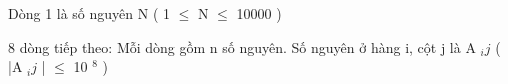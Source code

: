 Dòng 1 là số nguyên N ( 1  $\le$  N  $\le$  10000 )  

   8 dòng tiếp theo: Mỗi dòng gồm n số nguyên. Số nguyên ở hàng i, cột j là A   $_    ij   $   ( |A   $_    ij   $   |  $\le$  10   $^    8   $   )  

\